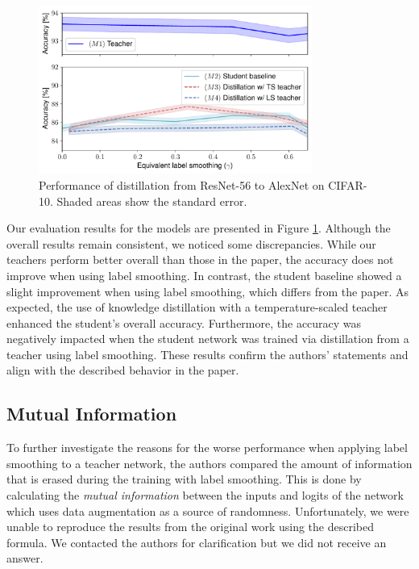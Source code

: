 \begin{figure}[ht]
\centering
\includegraphics[width=0.8\textwidth]{figures/knowledge_distillation.pdf}
\caption{Performance of distillation from ResNet-56 to AlexNet on CIFAR-10. Shaded areas show the standard error.}
\label{fig:conv_dist}

\end{figure}
Our evaluation results for the models are presented in Figure \ref{fig:conv_dist}. Although the overall results remain consistent, we noticed some discrepancies. While our teachers perform better overall than those in the paper, the accuracy does not improve when using label smoothing. In contrast, the student baseline showed a slight improvement when using label smoothing, which differs from the paper. 
As expected, the use of knowledge distillation with a temperature-scaled teacher enhanced the student's overall accuracy. Furthermore, the accuracy was negatively impacted when the student network was trained via distillation from a teacher using label smoothing. These results confirm the authors' statements and align with the described behavior in the paper.

\subsection{Mutual Information}
To further investigate the reasons for the worse performance when applying label smoothing to a teacher network, the authors compared the amount of information that is erased during the training with label smoothing. This is done by calculating the \textit{mutual information} between the inputs and logits of the network which uses data augmentation as a source of randomness.
Unfortunately, we were unable to reproduce the results from the original work using the described formula. We contacted the authors for clarification but we did not receive an answer.

